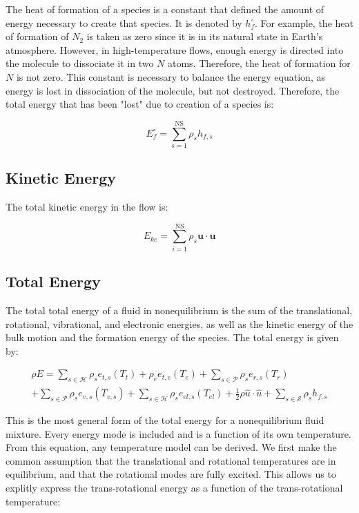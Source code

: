 \documentclass[10pt]{article}
\begin{document}
\begin{flushleft}
The heat of formation of a species is a constant that defined the amount of energy necessary to create that species. It is denoted by $h_{f}^\circ \label{eq:heat-form}$. For example, the heat of formation of $N_2$ is taken as zero since it is in its natural state in Earth's atmosphere. However, in high-temperature flows, enough energy is directed into the molecule to dissociate it in two $N$ atoms. Therefore, the heat of formation for $N$ is not zero. This constant is necessary to balance the energy equation, as energy is lost in dissociation of the molecule, but not destroyed. Therefore, the total energy that has been "lost" due to creation of a species is:



\begin{equation*}
    E_f^\circ = \sum_{s=1}^\text{NS} \rho_s h_{f,s}
    \label{eq:form-energy}
\end{equation*}

\subsection{Kinetic Energy}

The total kinetic energy in the flow is:

\begin{equation*}
    E_{ke} = \sum_{i=1}^\text{NS} \rho_s \boldsymbol{u} \cdot \boldsymbol{u}
    \label{eq:kinetic-energy}
\end{equation*}

\subsection{Total Energy}

The total total energy of a fluid in nonequilibrium is the sum of the translational, rotational, vibrational, and electronic energies, as well as the kinetic energy of the bulk motion and the formation energy of the species. The total energy is given by:

\begin{multline}
    \rho E = \sum_{s \in \mathcal{H}} \rho_s e_{t,s} (T_t) + \rho_e e_{t,e} (T_e) + \sum_{s \in \mathcal{P}} \rho_s e_{r,s} (T_r) \\ + \sum_{s \in \mathcal{P}} \rho_s e_{v,s} (T_{v,s}) + \sum_{s \in \mathcal{H}} \rho_s e_{el,s} (T_{el}) + \frac{1}{2} \rho \hat{u} \cdot \hat{u} + \sum_{s \in \mathcal{S}} \rho_s h_{f,s}
\end{multline}

This is the most general form of the total energy for a nonequilibrium fluid mixture. Every energy mode is included and is a function of its own temperature. From this equation, any temperature model can be derived. We first make the common assumption that the translational and rotational temperatures are in equilibrium, and that the rotational modes are fully excited. This allows us to explitly express the trans-rotational energy as a function of the trans-rotational temperature:


\end{flushleft}
\end{document}
